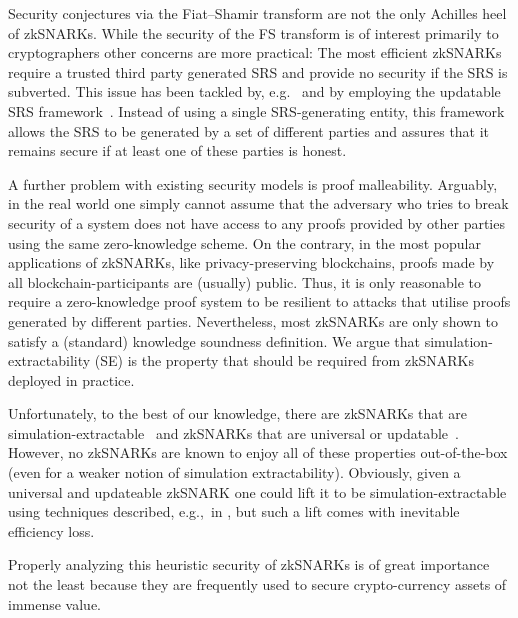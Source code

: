 \documentclass[runningheads,10pt]{llncs}
\begin{document}
Security conjectures via the Fiat--Shamir transform are not the only Achilles
heel of zkSNARKs. While the security of the FS transform is of interest
primarily to cryptographers other concerns are more practical: The most
efficient zkSNARKs require a trusted third party generated SRS and provide no
security if the SRS is subverted. This issue has been tackled by, e.g.~\plonk{}
and \sonic{} by employing the updatable SRS framework~\cite{C:GKMMM18}. Instead
of using a single SRS-generating entity, this framework allows the SRS to be
generated by a set of different parties and assures that it remains secure if at
least one of these parties is honest.

A further problem with existing security models is proof malleability.
Arguably, in the real world one simply cannot assume that the adversary who
tries to break security of a system does not have access to any proofs provided
by other parties using the same zero-knowledge scheme. On the contrary, in the
most popular applications of zkSNARKs, like privacy-preserving blockchains,
proofs made by all blockchain-participants are (usually) public. Thus, it is
only reasonable to require a zero-knowledge proof system to be resilient to
attacks that utilise proofs generated by different parties.  Nevertheless, most
zkSNARKs are only shown to satisfy a (standard) knowledge soundness
definition. We argue that simulation-extractability (SE) is the property that
should be required from zkSNARKs deployed in practice.

Unfortunately, to the best of our knowledge, there are zkSNARKs that are
simulation-extractable~\cite{C:GroMal17,EPRINT:BowGab18,EPRINT:AtaBag19,EC:Groth16}
and zkSNARKs that are universal or
updatable~\cite{C:GKMMM18,CCS:MBKM19,EPRINT:GabWilCio19,EC:CHMMVW20}. However,
no zkSNARKs are known to enjoy all of these properties out-of-the-box (even for
a weaker notion of simulation extractability). Obviously, given a universal and
updateable zkSNARK one could lift it to be simulation-extractable using
techniques described, e.g.,~in \cite{EPRINT:KZMQCP15,CCS:AbdRamSla20}, but such
a lift comes with inevitable efficiency loss. %

Properly analyzing this heuristic security of zkSNARKs is of great
importance not the least because they are frequently used to secure
crypto-currency assets of immense value.
\end{document}
